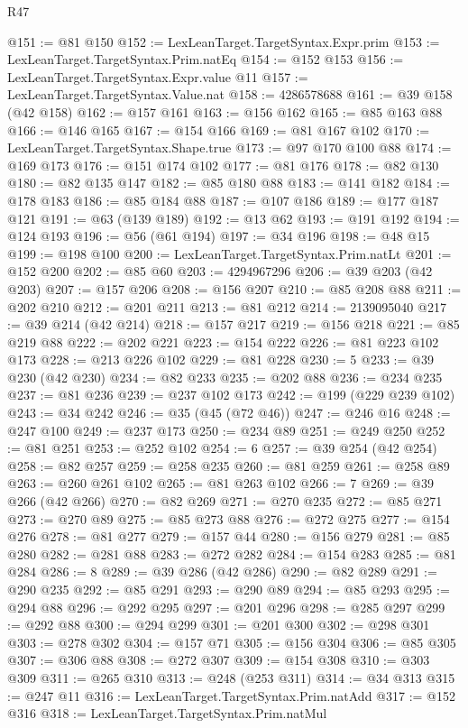 \begin{lexlean}{R47}
\begin{coremodule}
@151 := @81 @150
@152 := LexLeanTarget.TargetSyntax.Expr.prim
@153 := LexLeanTarget.TargetSyntax.Prim.natEq
@154 := @152 @153
@156 := LexLeanTarget.TargetSyntax.Expr.value @11
@157 := LexLeanTarget.TargetSyntax.Value.nat
@158 := 4286578688
@161 := @39 @158 (@42 @158)
@162 := @157 @161
@163 := @156 @162
@165 := @85 @163 @88
@166 := @146 @165
@167 := @154 @166
@169 := @81 @167 @102
@170 := LexLeanTarget.TargetSyntax.Shape.true
@173 := @97 @170 @100 @88
@174 := @169 @173
@176 := @151 @174 @102
@177 := @81 @176
@178 := @82 @130
@180 := @82 @135 @147
@182 := @85 @180 @88
@183 := @141 @182
@184 := @178 @183
@186 := @85 @184 @88
@187 := @107 @186
@189 := @177 @187 @121
@191 := @63 (@139 @189)
@192 := @13 @62
@193 := @191 @192
@194 := @124 @193
@196 := @56 (@61 @194)
@197 := @34 @196
@198 := @48 @15
@199 := @198 @100
@200 := LexLeanTarget.TargetSyntax.Prim.natLt
@201 := @152 @200
@202 := @85 @60
@203 := 4294967296
@206 := @39 @203 (@42 @203)
@207 := @157 @206
@208 := @156 @207
@210 := @85 @208 @88
@211 := @202 @210
@212 := @201 @211
@213 := @81 @212
@214 := 2139095040
@217 := @39 @214 (@42 @214)
@218 := @157 @217
@219 := @156 @218
@221 := @85 @219 @88
@222 := @202 @221
@223 := @154 @222
@226 := @81 @223 @102 @173
@228 := @213 @226 @102
@229 := @81 @228
@230 := 5
@233 := @39 @230 (@42 @230)
@234 := @82 @233
@235 := @202 @88
@236 := @234 @235
@237 := @81 @236
@239 := @237 @102 @173
@242 := @199 (@229 @239 @102)
@243 := @34 @242
@246 := @35 (@45 (@72 @46))
@247 := @246 @16
@248 := @247 @100
@249 := @237 @173
@250 := @234 @89
@251 := @249 @250
@252 := @81 @251
@253 := @252 @102
@254 := 6
@257 := @39 @254 (@42 @254)
@258 := @82 @257
@259 := @258 @235
@260 := @81 @259
@261 := @258 @89
@263 := @260 @261 @102
@265 := @81 @263 @102
@266 := 7
@269 := @39 @266 (@42 @266)
@270 := @82 @269
@271 := @270 @235
@272 := @85 @271
@273 := @270 @89
@275 := @85 @273 @88
@276 := @272 @275
@277 := @154 @276
@278 := @81 @277
@279 := @157 @44
@280 := @156 @279
@281 := @85 @280
@282 := @281 @88
@283 := @272 @282
@284 := @154 @283
@285 := @81 @284
@286 := 8
@289 := @39 @286 (@42 @286)
@290 := @82 @289
@291 := @290 @235
@292 := @85 @291
@293 := @290 @89
@294 := @85 @293
@295 := @294 @88
@296 := @292 @295
@297 := @201 @296
@298 := @285 @297
@299 := @292 @88
@300 := @294 @299
@301 := @201 @300
@302 := @298 @301
@303 := @278 @302
@304 := @157 @71
@305 := @156 @304
@306 := @85 @305
@307 := @306 @88
@308 := @272 @307
@309 := @154 @308
@310 := @303 @309
@311 := @265 @310
@313 := @248 (@253 @311)
@314 := @34 @313
@315 := @247 @11
@316 := LexLeanTarget.TargetSyntax.Prim.natAdd
@317 := @152 @316
@318 := LexLeanTarget.TargetSyntax.Prim.natMul

\end{coremodule}
\end{lexlean}
